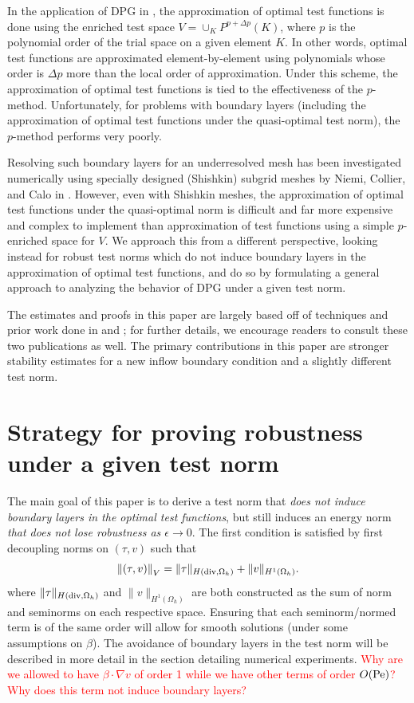 \documentclass[11pt,onecolumn]{scrartcl}
\newcommand{\grad}{\nabla}
\begin{document}
In the application of DPG in \cite{DPG1,DPG2,DPG3,DPG4}, the approximation of optimal test functions is done using the enriched test space $V = \cup_{K} P^{p+\Delta p}(K)$, where $p$ is the polynomial order of the trial space on a given element $K$.  In other words, optimal test functions are approximated element-by-element using polynomials whose order is $\Delta p$ more than the local order of approximation.  Under this scheme, the approximation of optimal test functions is tied to the effectiveness of the $p$-method.  Unfortunately, for problems with boundary layers (including the approximation of optimal test functions under the quasi-optimal test norm), the $p$-method performs very poorly.  

Resolving such boundary layers for an underresolved mesh has been investigated numerically using specially designed (Shishkin) subgrid meshes by Niemi, Collier, and Calo in \cite{DBLP:journals/procedia/NiemiCC11}.  However, even with Shishkin meshes, the approximation of optimal test functions under the quasi-optimal norm is difficult and far more expensive and complex to implement than approximation of test functions using a simple $p$-enriched space for $V$. We approach this from a different perspective, looking instead for robust test norms which do not induce boundary layers in the approximation of optimal test functions, and do so by formulating a general approach to analyzing the behavior of DPG under a given test norm.  

The estimates and proofs in this paper are largely based off of techniques and prior work done in \cite{DPGrobustness} and \cite{analysisDPG}; for further details, we encourage readers to consult these two publications as well.  The primary contributions in this paper are stronger stability estimates for a new inflow boundary condition and a slightly different test norm.  

\section{Strategy for proving robustness under a given test norm}

The main goal of this paper is to derive a test norm that \textit{does not induce boundary layers in the optimal test functions}, but still induces an energy norm \textit{that does not lose robustness as $\epsilon \rightarrow 0$}.  The first condition is satisfied by first decoupling norms on $\left(\tau,v\right)$ such that
\[
\left\|\left(\tau,v\right)\right\|_V = \|\tau\|_{H({\rm div},\Omega_h)} +  \|v\|_{H^1(\Omega_h)}.
\]
where $\|\tau\|_{H({\rm div},\Omega_h)}$ and $ \|v\|_{H^1(\Omega_h)}$ are both constructed as the sum of norm and seminorms on each respective space.  Ensuring that each seminorm/normed term is of the same order will allow for smooth solutions (under some assumptions on $\beta$).  The avoidance of boundary layers in the test norm will be described in more detail in the section detailing numerical experiments.  
\textcolor{red}{Why are we allowed to have $\beta\cdot \grad v$ of order 1 while we have other terms of order $O({\rm Pe})$?  Why does this term not induce boundary layers?}
\end{document}
